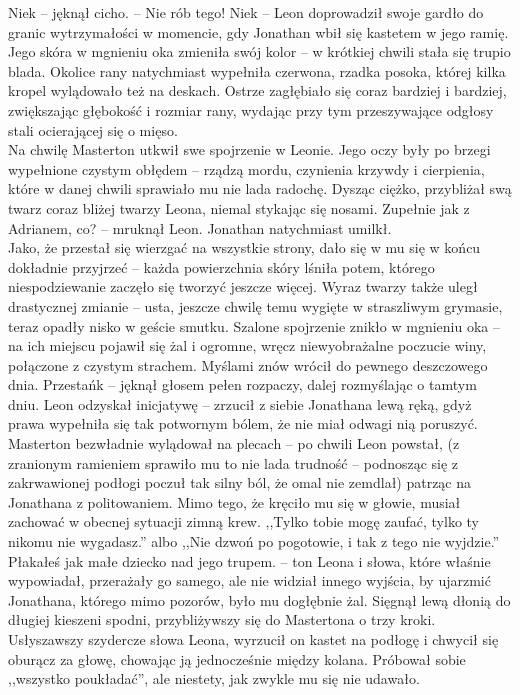 \documentclass[../MAIN.tex]{subfiles}
\begin{document}
\sx Nie\3k -- jęknął cicho. -- Nie rób tego! Nie\3k -- Leon doprowadził swoje gardło do granic wytrzymałości w momencie, gdy Jonathan wbił się kastetem w jego ramię.
\qd
Jego skóra w mgnieniu oka zmieniła swój kolor -- w krótkiej chwili stała się trupio blada. Okolice rany natychmiast wypełniła czerwona, rzadka posoka, której kilka kropel wylądowało też na deskach. Ostrze zagłębiało się coraz bardziej i bardziej, zwiększając głębokość i rozmiar rany, wydając przy tym przeszywające odgłosy stali ocierającej się o mięso.\\
Na chwilę Masterton utkwił swe spojrzenie w Leonie.
Jego oczy były po brzegi wypełnione czystym obłędem -- rządzą mordu, czynienia krzywdy i cierpienia, które w danej chwili sprawiało mu nie lada radochę. Dysząc ciężko, przybliżał swą twarz coraz bliżej twarzy Leona, niemal stykając się nosami.
\sx Zupełnie jak z Adrianem, co? -- mruknął Leon.\qd
Jonathan natychmiast umilkł.\\
Jako, że przestał się wierzgać na wszystkie strony, dało się w mu się w końcu dokładnie przyjrzeć -- każda powierzchnia skóry lśniła potem, którego niespodziewanie zaczęło się tworzyć jeszcze więcej. Wyraz twarzy także uległ drastycznej zmianie -- usta, jeszcze chwilę temu wygięte w straszliwym grymasie, teraz opadły nisko w geście smutku. Szalone spojrzenie znikło w mgnieniu oka -- na ich miejscu pojawił się żal i ogromne, wręcz niewyobrażalne poczucie winy, połączone z czystym strachem. Myślami znów wrócił do pewnego deszczowego dnia.
\sx Przestań\3k -- jęknął głosem pełen rozpaczy, dalej rozmyślając o tamtym dniu.
\qd
Leon odzyskał inicjatywę -- zrzucił z siebie Jonathana lewą ręką, gdyż prawa wypełniła się tak potwornym bólem, że nie miał odwagi nią poruszyć. Masterton bezwładnie wylądował na plecach -- po chwili Leon powstał, (z zranionym ramieniem sprawiło mu to nie lada trudność -- podnosząc się z zakrwawionej podłogi poczuł tak silny ból, że omal nie zemdlał) patrząc na Jonathana z politowaniem. Mimo tego, że kręciło mu się w głowie, musiał zachować w obecnej sytuacji zimną krew.
\sx ,,Tylko tobie mogę zaufać, tylko ty nikomu nie wygadasz.'' albo ,,Nie dzwoń po pogotowie, i tak z tego nie wyjdzie.'' 
\qd
Płakałeś jak małe dziecko nad jego trupem. -- ton Leona i słowa, które właśnie wypowiadał, przerażały go samego, ale nie widział innego wyjścia, by ujarzmić Jonathana, którego mimo pozorów, było mu dogłębnie żal. Sięgnął lewą dłonią do długiej kieszeni spodni, przybliżywszy się do Mastertona o trzy kroki.\\ Usłyszawszy szydercze słowa Leona, wyrzucił on kastet na podłogę i chwycił się oburącz za głowę, chowając ją jednocześnie między kolana. Próbował sobie ,,wszystko poukładać'', ale niestety, jak zwykle mu się nie udawało.
\end{document}
